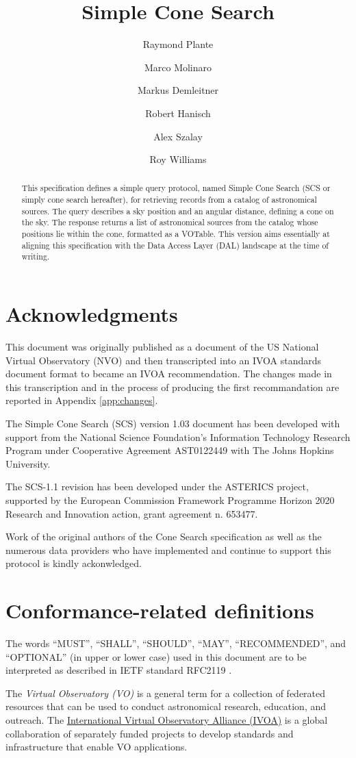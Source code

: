 \documentclass[11pt,a4paper]{ivoa}
\title{Simple Cone Search}
\author[http://www.ivoa.net/twiki/bin/view/IVOA/RayPlante]{Raymond Plante}
\author[http://www.ivoa.net/twiki/bin/view/IVOA/MarcoMolinaro]{Marco Molinaro}
\author[http://www.ivoa.net/twiki/bin/view/IVOA/MarkusDemleitner]{Markus Demleitner}
\author[http://www.ivoa.net/twiki/bin/view/IVOA/BobHanisch]{Robert Hanisch}
\author[http://www.ivoa.net/twiki/bin/view/IVOA/AlexSzalay]{Alex Szalay}
\author[http://www.ivoa.net/twiki/bin/view/IVOA/RoyWilliams]{Roy Williams}
\begin{document}
\begin{abstract}
This specification defines a simple query protocol, named Simple Cone Search (SCS or simply cone search hereafter), for retrieving records from a catalog of astronomical sources. The query describes a sky position and an angular distance, defining a cone on the sky. The response returns a list of astronomical sources from the catalog whose positions lie within the cone, formatted as a VOTable. This version aims essentially at aligning this specification with the Data Access Layer (DAL) landscape at the time of writing.
\end{abstract}


\section*{Acknowledgments}
This document was originally published as a document of the US National Virtual Observatory (NVO)  and then transcripted into an IVOA standards document format to became an IVOA recommendation. The changes made in this transcription and in the process of producing the first recommandation are reported in Appendix \ref{app:changes}.

The Simple Cone Search (SCS) version 1.03 document has been developed with support from the National Science Foundation's Information Technology Research Program under Cooperative Agreement AST0122449 with The Johns Hopkins University.

The SCS-1.1 revision has been developed under the ASTERICS project, supported by the European Commission Framework Programme Horizon 2020 Research and Innovation action, grant agreement n. 653477.

Work of the original authors of the Cone Search specification as well as the numerous data providers who have implemented and continue to support this protocol is kindly ackonwledged.

\section*{Conformance-related definitions}

The words ``MUST'', ``SHALL'', ``SHOULD'', ``MAY'', ``RECOMMENDED'', and
``OPTIONAL'' (in upper or lower case) used in this document are to be
interpreted as described in IETF standard RFC2119 \citep{std:RFC2119}.

The \emph{Virtual Observatory (VO)} is a
general term for a collection of federated resources that can be used
to conduct astronomical research, education, and outreach.
The \href{http://www.ivoa.net}{International
Virtual Observatory Alliance (IVOA)} is a global
collaboration of separately funded projects to develop standards and
infrastructure that enable VO applications.
\end{document}
